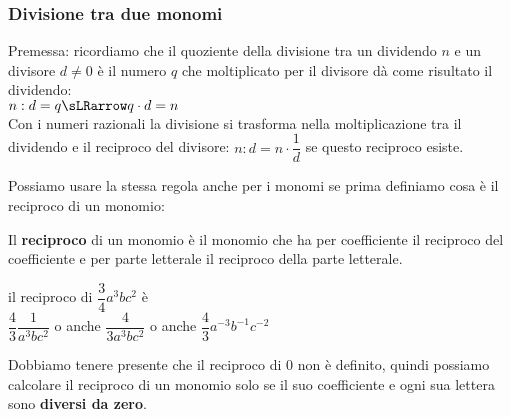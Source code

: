 % 


\subsubsection{Divisione tra due monomi}
\label{subsubsec:monomi_divisione}

Premessa: ricordiamo che il quoziente della divisione tra un dividendo 
\(n\) e un divisore \(d \neq 0\) è il numero \(q\) che moltiplicato per 
il divisore dà come risultato il dividendo: \\
\hspace*{39mm}\(n : d = q \sLRarrow q \cdot d = n\)\\
Con i numeri razionali la divisione si trasforma nella moltiplicazione 
tra il dividendo e il reciproco del divisore: \quad
\(n : d = n \cdot \dfrac{1}{d}\) \quad
se questo reciproco esiste.

Possiamo usare la stessa regola anche per i monomi se prima definiamo 
cosa è il reciproco di un monomio:

\begin{definizione}{}{}
Il \textbf{reciproco} di un monomio è il monomio che ha per coefficiente 
il reciproco del coefficiente e per parte letterale il reciproco della 
parte letterale.
\end{definizione}

\begin{esempio}{}{}
 il reciproco di \(\dfrac{3}{4}a^3bc^2\) \quad è\\
\(\dfrac{4}{3}\dfrac{1}{a^3bc^2}\) \quad o anche \quad
\(\dfrac{4}{3a^3bc^2}\) \quad o anche \quad
\(\dfrac{4}{3}a^{-3}b^{-1}c^{-2}\)
\end{esempio}

Dobbiamo tenere presente che il reciproco di \(0\) non è definito, 
quindi possiamo calcolare il reciproco di un monomio solo se il suo 
coefficiente e ogni sua lettera sono \textbf{diversi da zero}.

